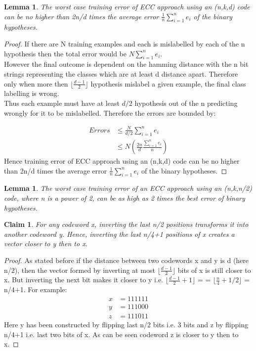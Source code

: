 \documentclass[11pt]{article}
\newtheorem{lemma}[theorem]{Lemma}
\newtheorem{claim}[theorem]{Claim}
\begin{document}
    \begin{lemma}
        The worst case training error of ECC approach using an (n,k,d) code can be no higher than 2n/d times the average error $\frac{1}{n}\sum_{i=1}^n e_i$ of the binary hypotheses.
    \end{lemma}
    \begin{proof}
        If there are N training examples and each is mislabelled by each of the n hypothesis then the total error would be $N \sum_{i=1}^n e_i$.\\
        However the final outcome is dependent on the hamming distance with the n bit strings representing the classes which are at least d distance apart. Therefore only when more then $\lfloor\frac{d-1}{2}\rfloor$ hypothesis mislabel a given example, the final class labelling is wrong.\\
        Thus each example must have at least $d/2$ hypothesis out of the n predicting wrongly for it to be mislabelled. Therefore the errors are bounded by:
    
        \begin{align*}
            Errors &\leq \frac{N}{d/2} \sum_{i=1}^n e_i\\
            &\leq N \left(\frac{2n}{d} \frac{\sum_{i=1}^n e_i}{n}\right)
         \end{align*}
        Hence training error of ECC approach using an (n,k,d) code can be no higher than 2n/d times the average error $\frac{1}{n}\sum_{i=1}^n e_i$ of the binary hypotheses.
    \end{proof}
    
    \begin{lemma} 
        The worst case training error of an ECC approach using an (n,k,n/2) code, where n is a power of 2, can be as high as 2 times the best error of binary hypotheses.
    \end{lemma}
    
            \begin{claim}
                For any codeword x, inverting the last n/2 positions transforms it into another codeword y. Hence, inverting the last n/4+1 positions of x creates a vector closer to y then to x.
            \end{claim}
            \begin{proof}
                As stated before if the distance between two codewords x and y is d (here n/2), then the vector formed by inverting at most $\lfloor\frac{d-1}{2}\rfloor$ bits of x is still closer to x. But inverting the next bit makes it closer to y i.e. $\lfloor\frac{d-1}{2}+1\rfloor$  =  = $\lfloor\frac{n}{4}+1/2\rfloor$ = n/4+1. For example:
                \begin{align*}
                    x & = 111111\\
                    y & = 111000\\
                    z & = 111011
                \end{align*}
                Here y has been constructed by flipping last n/2 bits i.e. 3 bits and z by flipping n/4+1 i.e. last two bits of x. As can be seen codeword z is closer to y then to x.
            \end{proof}
                
\end{document}
